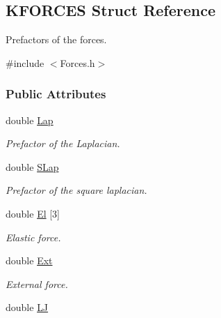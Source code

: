 \hypertarget{structKFORCES}{}\subsection{K\+F\+O\+R\+C\+ES Struct Reference}
\label{structKFORCES}


Prefactors of the forces.  




{\ttfamily \#include $<$Forces.\+h$>$}

\subsubsection*{Public Attributes}
\begin{DoxyCompactItemize}
\item 
double \hyperlink{structKFORCES_ad68dc62d6c1b859ad3abebc60476453e}{Lap}\hypertarget{structKFORCES_ad68dc62d6c1b859ad3abebc60476453e}{}\label{structKFORCES_ad68dc62d6c1b859ad3abebc60476453e}

\begin{DoxyCompactList}\small\item\em Prefactor of the Laplacian. \end{DoxyCompactList}\item 
double \hyperlink{structKFORCES_a348745786658bd8382be1fd25066a309}{S\+Lap}\hypertarget{structKFORCES_a348745786658bd8382be1fd25066a309}{}\label{structKFORCES_a348745786658bd8382be1fd25066a309}

\begin{DoxyCompactList}\small\item\em Prefactor of the square laplacian. \end{DoxyCompactList}\item 
double \hyperlink{structKFORCES_a682d0bf554363bfcb9698c55bd6a0527}{El} \mbox{[}3\mbox{]}\hypertarget{structKFORCES_a682d0bf554363bfcb9698c55bd6a0527}{}\label{structKFORCES_a682d0bf554363bfcb9698c55bd6a0527}

\begin{DoxyCompactList}\small\item\em Elastic force. \end{DoxyCompactList}\item 
double \hyperlink{structKFORCES_a60a1f1fb24ef62e5433e4c50466a1624}{Ext}\hypertarget{structKFORCES_a60a1f1fb24ef62e5433e4c50466a1624}{}\label{structKFORCES_a60a1f1fb24ef62e5433e4c50466a1624}

\begin{DoxyCompactList}\small\item\em External force. \end{DoxyCompactList}\item 
double \hyperlink{structKFORCES_a014d64316c28b7014a2e8696ea99388f}{LJ}\hypertarget{structKFORCES_a014d64316c28b7014a2e8696ea99388f}{}\label{structKFORCES_a014d64316c28b7014a2e8696ea99388f}


\end{DoxyCompactItemize}
